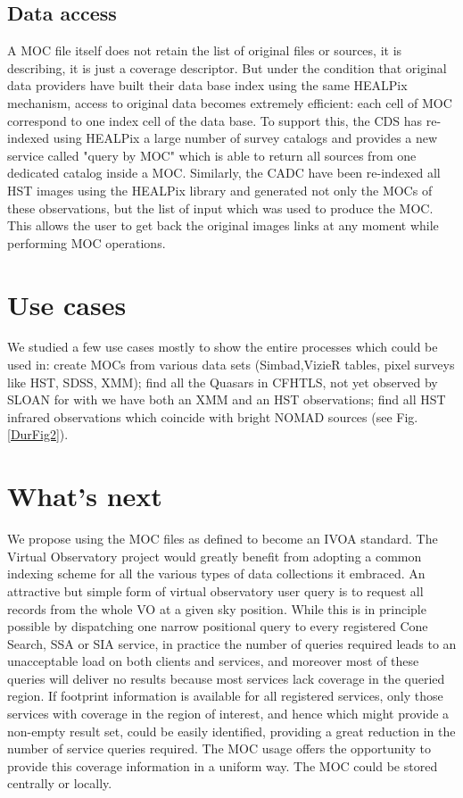 \subsection{Data access}
A MOC file itself does not retain the list of original files or sources, it is describing, it is just a coverage descriptor. But under the condition that original data providers have built their data base index using the same HEALPix mechanism, access to original data becomes extremely efficient: each cell of MOC correspond to one index cell of the data base. 
To support this, the CDS has re-indexed using HEALPix a large number of survey catalogs and provides a new service called "query by MOC" which is able to return all sources from one dedicated catalog inside a MOC. Similarly, the CADC have been re-indexed all HST images using the HEALPix library and generated not only the MOCs of these observations, but the list of input which was used to produce the MOC. This allows the user to get back the original images links at any moment while performing MOC operations.


\section{Use cases}
We studied a few use cases mostly to show the entire processes which could be used in: create MOCs from various data sets (Simbad,VizieR tables, pixel surveys like HST, SDSS, XMM); find all the Quasars in CFHTLS, not yet observed by SLOAN for with we have both an XMM and an HST observations; find all HST infrared observations which coincide with bright NOMAD sources (see Fig. \ref{DurFig2}).


\section{What's next}

We propose using the MOC files as defined to become an IVOA standard. 
The Virtual Observatory project would greatly benefit from adopting a common indexing scheme for all the various types of data collections it embraced. 
An attractive but simple form of virtual observatory user query is
to request all records from the whole VO at a given sky position.
While this is in principle possible by dispatching one narrow
positional query to every registered Cone Search, SSA or SIA service,
in practice the number of queries required leads to an unacceptable
load on both clients and services, and moreover most of these queries
will deliver no results because most services lack coverage in the
queried region. If footprint information is available for all registered services, only those
services with coverage in the region of interest, and hence which
might provide a non-empty result set, could be easily identified,
providing a great reduction in the number of service queries required.
The MOC usage offers the opportunity to provide
this coverage information in a uniform way. The MOC could be stored centrally or locally.


